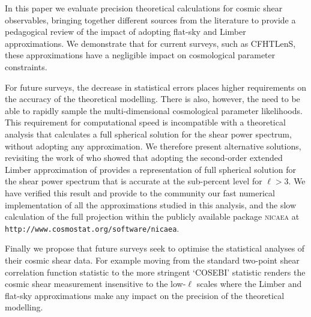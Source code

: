 In this paper we evaluate precision theoretical calculations for cosmic shear observables, bringing together different sources from the literature to provide a pedagogical review of the impact of adopting flat-sky and Limber approximations.  We demonstrate that for current surveys, such as CFHTLenS, these approximations have a negligible impact on cosmological parameter constraints.

For future surveys, the decrease in statistical errors places higher requirements on the accuracy of the theoretical modelling.    There is also, however, the need to be able to rapidly sample the multi-dimensional cosmological parameter likelihoods.  This requirement for computational speed is incompatible with a theoretical analysis that calculates a full spherical solution for the shear power spectrum, without adopting any approximation.  We therefore present alternative solutions, revisiting the work of  \citet{2012PhRvD..86b3001B} who showed that adopting the second-order extended Limber approximation of \citet{2008PhRvD..78l3506L} provides a representation of full spherical solution for the shear power spectrum that is accurate at the sub-percent level for $\ell > 3$.    We have verified this result and provide to the community our fast numerical implementation of all the approximations studied in this analysis,
and the slow calculation of the full projection within the publicly available package \textsc{nicaea} at \texttt{http://www.cosmostat.org/software/nicaea}.

Finally we propose that future surveys seek to optimise the statistical analyses of their cosmic shear data.  For example moving from the standard two-point shear correlation function statistic to the more stringent `COSEBI' statistic \citep{COSEBIs} renders the cosmic shear measurement insensitive to the low-$\ell$ scales where the Limber and flat-sky approximations make any impact on the precision of the theoretical modelling.  

